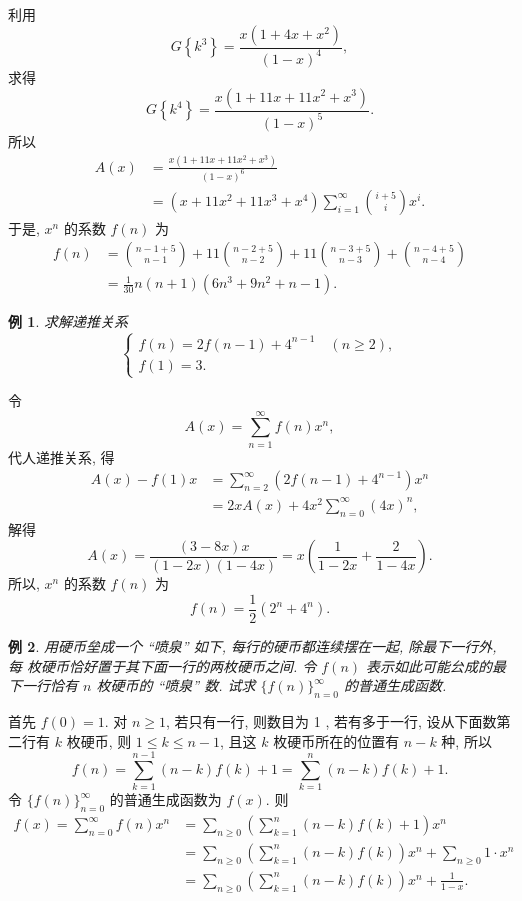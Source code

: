 \documentclass[punct]{ctexbeamer}
\newtheorem{ex}{例}[section]
\def\sol{\noindent {\bf 解\ }}
\begin{document}
\begin{frame}
	利用
	$$
	G\left\{k^3\right\}=\frac{x\left(1+4 x+x^2\right)}{(1-x)^4},
	$$
	求得
	$$
	G\left\{k^4\right\}=\frac{x\left(1+11 x+11 x^2+x^3\right)}{(1-x)^5}.
	$$
	所以$$
	\begin{aligned}
		A(x) &=\frac{x\left(1+11 x+11 x^2+x^3\right)}{(1-x)^6} \\
		&=\left(x+11 x^2+11 x^3+x^4\right) \sum_{i=1}^{\infty}\binom{i+5}{i} x^i .
	\end{aligned}
	$$
	于是, $x^n$ 的系数 $f(n)$ 为
	$$
	\begin{aligned}
		f(n) &=
		\binom{n-1+5}{n-1}
		+11\binom{n-2+5}{n-2}+11\binom{n-3+5}{n-3}+\binom{n-4+5}{n-4} \\
		&=\frac{1}{30} n(n+1)\left(6 n^3+9 n^2+n-1\right) .
	\end{aligned}
	$$
\end{frame}

\begin{frame}
	\begin{ex}
		求解递推关系
		$$
		\left\{\begin{array}{l}
			f(n)=2 f(n-1)+4^{n-1} \quad(n \geqslant 2), \\
			f(1)=3 .
		\end{array}\right.
		$$
	\end{ex}
\pause\sol
令
$$
A(x)=\sum_{n=1}^{\infty} f(n) x^n,
$$
代人递推关系, 得
$$
\begin{aligned}
	A(x)-f(1) x &=\sum_{n=2}^{\infty}\left( 2 f(n-1)+4^{n-1}\right)  x^n \\
	&=2 x A(x)+4 x^2 \sum_{n=0}^{\infty}(4 x)^n,
\end{aligned}
$$
解得
$$
A(x)=\frac{(3-8 x) x}{(1-2 x)(1-4 x)}=x\left(\frac{1}{1-2 x}+\frac{2}{1-4 x}\right) .
$$
所以, $x^n$ 的系数 $f(n)$ 为
$$
f(n)=\frac{1}{2}\left(2^n+4^n\right) .
$$
\end{frame}

\begin{frame}
	\begin{ex}
		用硬币垒成一个 “喷泉” 如下, 每行的硬币都连续摆在一起, 除最下一行外, 每 枚硬币恰好置于其下面一行的两枚硬币之间. 令 $f(n)$ 表示如此可能㕕成的最下一行恰有 $n$ 枚硬币的 “喷泉” 数. 试求 $\{f(n)\}_{n=0}^{\infty}$ 的普通生成函数.
	\end{ex}
\pause\sol
首先 $f(0)=1$. 对 $n \geq 1$, 若只有一行, 则数目为 1 , 若有多于一行, 设从下面数第二行有 $k$ 枚硬币, 则 $1 \leq k \leq n-1$, 且这 $k$ 枚硬币所在的位置有 $n-k$ 种, 所以
$$
f(n)=\sum_{k=1}^{n-1}(n-k) f(k)+1=\sum_{k=1}^n(n-k) f(k)+1 .
$$
令 $\{f(n)\}_{n=0}^{\infty}$ 的普通生成函数为 $f(x)$. 则
$$
\begin{aligned}
	f(x)=\sum_{n=0}^{\infty} f(n) x^n &=\sum_{n \geq 0}\left(\sum_{k=1}^n(n-k) f(k)+1\right) x^n \\
	&=\sum_{n \geq 0}\left(\sum_{k=1}^n(n-k) f(k)\right) x^n+\sum_{n \geq 0} 1 \cdot x^n \\
	&=\sum_{n \geq 0}\left(\sum_{k=1}^n(n-k) f(k)\right) x^n+\frac{1}{1-x} .
\end{aligned}
$$

\end{frame}
\end{document}

